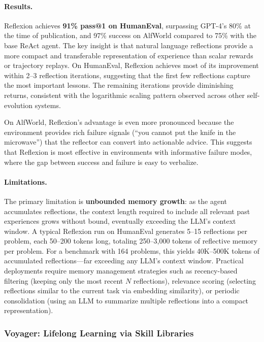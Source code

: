 \paragraph{Results.}
Reflexion achieves \textbf{91\% pass@1 on HumanEval}, surpassing GPT-4's 80\% at the time of publication, and 97\% success on AlfWorld compared to 75\% with the base ReAct agent. The key insight is that natural language reflections provide a more compact and transferable representation of experience than scalar rewards or trajectory replays. On HumanEval, Reflexion achieves most of its improvement within 2--3 reflection iterations, suggesting that the first few reflections capture the most important lessons. The remaining iterations provide diminishing returns, consistent with the logarithmic scaling pattern observed across other self-evolution systems.

On AlfWorld, Reflexion's advantage is even more pronounced because the environment provides rich failure signals (``you cannot put the knife in the microwave'') that the reflector can convert into actionable advice. This suggests that Reflexion is most effective in environments with informative failure modes, where the gap between success and failure is easy to verbalize.

\paragraph{Limitations.}
The primary limitation is \textbf{unbounded memory growth}: as the agent accumulates reflections, the context length required to include all relevant past experiences grows without bound, eventually exceeding the LLM's context window. A typical Reflexion run on HumanEval generates 5--15 reflections per problem, each 50--200 tokens long, totaling 250--3,000 tokens of reflective memory per problem. For a benchmark with 164 problems, this yields 40K--500K tokens of accumulated reflections---far exceeding any LLM's context window. Practical deployments require memory management strategies such as recency-based filtering (keeping only the most recent $N$ reflections), relevance scoring (selecting reflections similar to the current task via embedding similarity), or periodic consolidation (using an LLM to summarize multiple reflections into a compact representation).


\subsubsection{Voyager: Lifelong Learning via Skill Libraries}

